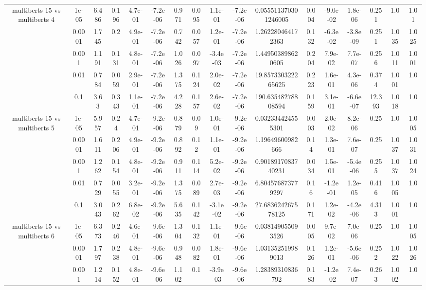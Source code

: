 \begin{tabular}{|c|c|c|c|c|c|c|c|c|c|c|c|c|c|c|c|c|}
\hline
\multirow{5}{*}{multiberts 15 vs multiberts 4} & 1e-05 & 6.486 & 0.196 & 4.7e-01 & -7.2e-06 & 0.971 & 0.095 & 1.1e-01 & -7.2e-06 & 0.055511370301246005 & 0.004 & -9.0e-02 & 1.8e-06 & 0.251 & 1.0 & 1.01 \\
 & 0.0001 & 1.745 & 0.2 & 4.9e-01 & -7.2e-06 & 0.742 & 0.057 & 1.2e-01 & -7.2e-06 & 1.262280464172363 & 0.132 & -6.3e-02 & -3.8e-09 & 0.251 & 1.035 & 1.025 \\
 & 0.001 & 1.191 & 0.131 & 4.8e-01 & -7.2e-06 & 1.026 & 0.097 & -3.4e-03 & -7.2e-06 & 1.449503898620605 & 0.204 & 7.9e-02 & 7.7e-07 & 0.256 & 1.011 & 1.001 \\
 & 0.01 & 0.784 & 0.059 & 2.9e-01 & -7.2e-06 & 1.375 & 0.124 & 2.0e-02 & -7.2e-06 & 19.857330322265625 & 0.223 & 1.6e-01 & 4.3e-06 & 0.374 & 1.001 & 1.0 \\
 & 0.1 & 3.63 & 0.343 & 1.1e-01 & -7.2e-06 & 4.228 & 0.157 & 2.6e-02 & -7.2e-06 & 190.63548278808594 & 0.159 & 3.1e-01 & -6.6e-07 & 12.393 & 1.018 & 1.0 \\
\hline
\multirow{5}{*}{multiberts 15 vs multiberts 5} & 1e-05 & 5.957 & 0.24 & 4.7e-01 & -9.2e-06 & 0.879 & 0.09 & 1.0e-01 & -9.2e-06 & 0.032334424555301 & 0.003 & 2.0e-02 & 8.2e-06 & 0.25 & 1.0 & 1.005 \\
 & 0.0001 & 1.611 & 0.206 & 4.9e-01 & -9.2e-06 & 0.892 & 0.12 & 1.1e-01 & -9.2e-06 & 1.19649600982666 & 0.14 & 1.3e-01 & 7.6e-07 & 0.25 & 1.037 & 1.031 \\
 & 0.001 & 1.262 & 0.154 & 4.8e-01 & -9.2e-06 & 0.911 & 0.114 & 5.2e-02 & -9.2e-06 & 0.9018917083740231 & 0.034 & 1.5e-01 & -5.4e-06 & 0.255 & 1.037 & 1.024 \\
 & 0.01 & 0.729 & 0.055 & 3.2e-01 & -9.2e-06 & 1.375 & 0.089 & 2.7e-03 & -9.2e-06 & 6.804576873779297 & 0.16 & -1.2e-01 & 1.2e-05 & 0.416 & 1.005 & 1.0 \\
 & 0.1 & 3.043 & 0.262 & 6.8e-02 & -9.2e-06 & 5.635 & 0.142 & -3.1e-02 & -9.2e-06 & 27.683624267578125 & 0.171 & 1.2e-02 & -4.2e-06 & 4.313 & 1.001 & 1.0 \\
\hline
\multirow{5}{*}{multiberts 15 vs multiberts 6} & 1e-05 & 6.373 & 0.246 & 4.6e-01 & -9.6e-06 & 1.304 & 0.132 & 1.1e-01 & -9.6e-06 & 0.038149055093526 & 0.005 & 9.7e-02 & 7.0e-06 & 0.25 & 1.0 & 1.005 \\
 & 0.0001 & 1.797 & 0.238 & 4.8e-01 & -9.6e-06 & 0.948 & 0.082 & 1.8e-01 & -9.6e-06 & 1.031352519989013 & 0.126 & 1.2e-01 & -5.6e-06 & 0.252 & 1.022 & 1.026 \\
 & 0.001 & 1.214 & 0.152 & 4.8e-01 & -9.6e-06 & 1.102 & 0.1 & -3.9e-03 & -9.6e-06 & 1.28389310836792 & 0.183 & -1.2e-02 & 7.4e-07 & 0.263 & 1.002 & 1.0 \\

\end{tabular}
